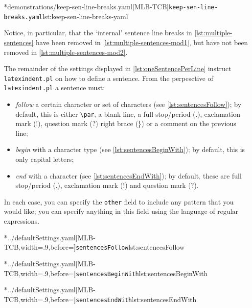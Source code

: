 	\begin{minipage}{.5\linewidth}
	\end{minipage}
	\hfill
	\begin{minipage}{.5\linewidth}
		\cmhlistingsfromfile[style=yaml-LST]*{demonstrations/keep-sen-line-breaks.yaml}[MLB-TCB]{\texttt{keep-sen-line-breaks.yaml}}{lst:keep-sen-line-breaks-yaml}
	\end{minipage}

	Notice, in particular, that the `internal' sentence line breaks in \cref{lst:multiple-sentences} have
	been removed in \cref{lst:multiple-sentences-mod1}, but have not been removed in \cref{lst:multiple-sentences-mod2}.

	The remainder of the settings displayed in \vref{lst:oneSentencePerLine} instruct \texttt{latexindent.pl} on how to define
	a sentence. From the perpesctive of \texttt{latexindent.pl} a sentence must:
	\begin{itemize}
		\item \emph{follow} a certain character or set of characters (see \cref{lst:sentencesFollow}); by default, this is either \lstinline!\par!, a blank line,
		      a full stop/period (.), exclamation mark (!), question mark (?) right brace (\}) or a comment
		      on the previous line;
		\item \emph{begin} with a character type (see \cref{lst:sentencesBeginWith}); by default, this is only capital letters;
		\item \emph{end} with a character (see \cref{lst:sentencesEndWith}); by default, these are
		      full stop/period (.), exclamation mark (!) and question mark (?).
	\end{itemize}
	In each case, you can specify the \texttt{other} field to include any pattern that you would like; you can specify anything in
	this field using the language of regular expressions.

	\begin{adjustwidth}{-3.5cm}{-2.5cm}
		\begin{minipage}{.36\linewidth}
			\cmhlistingsfromfile[style=sentencesFollow]*{../defaultSettings.yaml}[MLB-TCB,width=.9\linewidth,before=\centering]{\texttt{sentencesFollow}}{lst:sentencesFollow}
		\end{minipage}
		\hfill
		\begin{minipage}{.31\linewidth}
			\cmhlistingsfromfile[style=sentencesBeginWith]*{../defaultSettings.yaml}[MLB-TCB,width=.9\linewidth,before=\centering]{\texttt{sentencesBeginWith}}{lst:sentencesBeginWith}
		\end{minipage}
		\hfill
		\begin{minipage}{.31\linewidth}
			\cmhlistingsfromfile[style=sentencesEndWith]*{../defaultSettings.yaml}[MLB-TCB,width=.9\linewidth,before=\centering]{\texttt{sentencesEndWith}}{lst:sentencesEndWith}
		\end{minipage}
	\end{adjustwidth}

